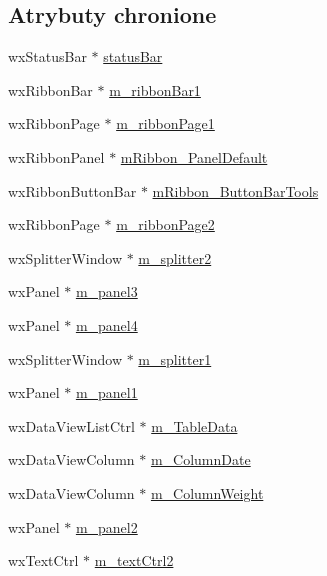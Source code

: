 \subsection*{Atrybuty chronione}
\begin{DoxyCompactItemize}
\item 
wx\+Status\+Bar $\ast$ \hyperlink{class_g_u_i_frame_aaead1e3685f946f4cf2b37968300536d}{status\+Bar}
\item 
wx\+Ribbon\+Bar $\ast$ \hyperlink{class_g_u_i_frame_a4b02944bb29cec15be93fef659f72c46}{m\+\_\+ribbon\+Bar1}
\item 
wx\+Ribbon\+Page $\ast$ \hyperlink{class_g_u_i_frame_a0f322f84e35af5b623bd6959e2e40f6f}{m\+\_\+ribbon\+Page1}
\item 
wx\+Ribbon\+Panel $\ast$ \hyperlink{class_g_u_i_frame_a9ed28512708a6780fa61e922432b8ce5}{m\+Ribbon\+\_\+\+Panel\+Default}
\item 
wx\+Ribbon\+Button\+Bar $\ast$ \hyperlink{class_g_u_i_frame_af716f8276acd84e4809ff152930e950a}{m\+Ribbon\+\_\+\+Button\+Bar\+Tools}
\item 
wx\+Ribbon\+Page $\ast$ \hyperlink{class_g_u_i_frame_a20ad742f09844d3a8e118c694b647ff9}{m\+\_\+ribbon\+Page2}
\item 
wx\+Splitter\+Window $\ast$ \hyperlink{class_g_u_i_frame_afe9d863db4f47e5e3ef6637a4e5c2f22}{m\+\_\+splitter2}
\item 
wx\+Panel $\ast$ \hyperlink{class_g_u_i_frame_afa782c80ec08b38bc1c7155181f804a4}{m\+\_\+panel3}
\item 
wx\+Panel $\ast$ \hyperlink{class_g_u_i_frame_a738374d963938e0a62e9a8c345ad4f10}{m\+\_\+panel4}
\item 
wx\+Splitter\+Window $\ast$ \hyperlink{class_g_u_i_frame_ae7e2fe484243591f8d8f74864615dded}{m\+\_\+splitter1}
\item 
wx\+Panel $\ast$ \hyperlink{class_g_u_i_frame_a332c2b34570ddce4d9b239367c132502}{m\+\_\+panel1}
\item 
wx\+Data\+View\+List\+Ctrl $\ast$ \hyperlink{class_g_u_i_frame_a58d864e96025cba9fb46a320461e4205}{m\+\_\+\+Table\+Data}
\item 
wx\+Data\+View\+Column $\ast$ \hyperlink{class_g_u_i_frame_a230303f14bac3741946470f81d8a7c07}{m\+\_\+\+Column\+Date}
\item 
wx\+Data\+View\+Column $\ast$ \hyperlink{class_g_u_i_frame_a99b64129f2b8cf9d9a645be02830b298}{m\+\_\+\+Column\+Weight}
\item 
wx\+Panel $\ast$ \hyperlink{class_g_u_i_frame_a84a4073aff66334e308650ab2da932d0}{m\+\_\+panel2}
\item 
wx\+Text\+Ctrl $\ast$ \hyperlink{class_g_u_i_frame_adede8a7af1c20027839a8025852f1358}{m\+\_\+text\+Ctrl2}
\end{DoxyCompactItemize}


